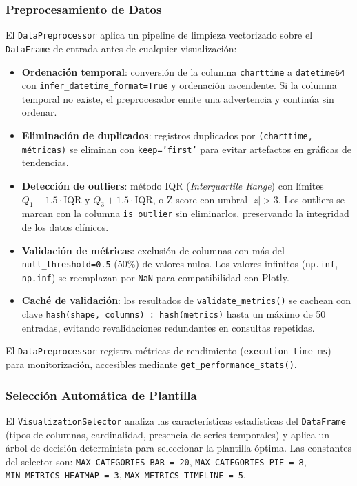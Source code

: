 \subsubsection{Preprocesamiento de Datos}

El \texttt{DataPreprocessor} aplica un pipeline de limpieza vectorizado sobre el \texttt{DataFrame} de entrada antes de cualquier visualización:

\begin{itemize}[nosep, leftmargin=*]
  \item \textbf{Ordenación temporal}: conversión de la columna \texttt{charttime} a \texttt{datetime64} con \texttt{infer\_datetime\_format=True} y ordenación ascendente. Si la columna temporal no existe, el preprocesador emite una advertencia y continúa sin ordenar.
  \item \textbf{Eliminación de duplicados}: registros duplicados por \texttt{(charttime, métricas)} se eliminan con \texttt{keep='first'} para evitar artefactos en gráficas de tendencias.
  \item \textbf{Detección de outliers}: método IQR (\textit{Interquartile Range}) con límites $Q_1 - 1.5 \cdot \text{IQR}$ y $Q_3 + 1.5 \cdot \text{IQR}$, o Z-score con umbral $|z| > 3$. Los outliers se marcan con la columna \texttt{is\_outlier} sin eliminarlos, preservando la integridad de los datos clínicos.
  \item \textbf{Validación de métricas}: exclusión de columnas con más del \texttt{null\_threshold=0.5} (50\%) de valores nulos. Los valores infinitos (\texttt{np.inf}, \texttt{-np.inf}) se reemplazan por \texttt{NaN} para compatibilidad con Plotly.
  \item \textbf{Caché de validación}: los resultados de \texttt{validate\_metrics()} se cachean con clave \texttt{hash(shape, columns) : hash(metrics)} hasta un máximo de 50 entradas, evitando revalidaciones redundantes en consultas repetidas.
\end{itemize}

El \texttt{DataPreprocessor} registra métricas de rendimiento (\texttt{execution\_time\_ms}) para monitorización, accesibles mediante \texttt{get\_performance\_stats()}.

\subsubsection{Selección Automática de Plantilla}

El \texttt{VisualizationSelector} analiza las características estadísticas del \texttt{DataFrame} (tipos de columnas, cardinalidad, presencia de series temporales) y aplica un árbol de decisión determinista para seleccionar la plantilla óptima. Las constantes del selector son: \texttt{MAX\_CATEGORIES\_BAR = 20}, \texttt{MAX\_CATEGORIES\_PIE = 8}, \texttt{MIN\_METRICS\_HEATMAP = 3}, \texttt{MAX\_METRICS\_TIMELINE = 5}.

